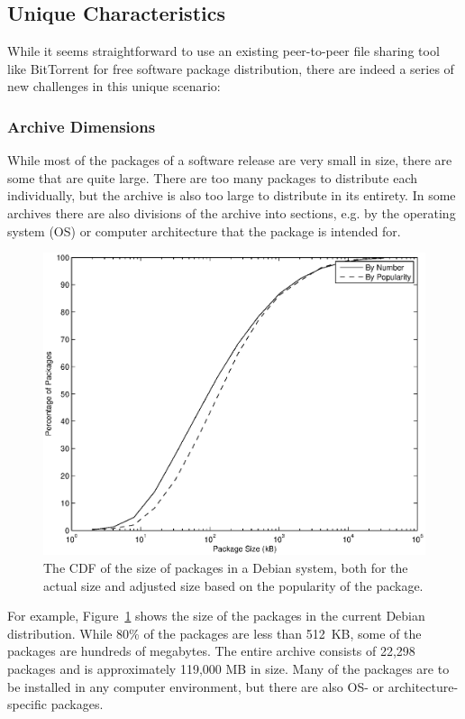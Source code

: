 \documentclass[conference]{IEEEtran}
\begin{document}
\subsection{Unique Characteristics}
\label{problems}

While it seems straightforward to use an existing peer-to-peer file sharing tool like BitTorrent for
free software package distribution, there are indeed a series of new challenges in this unique scenario:

\subsubsection{Archive Dimensions}

While most of the packages of a software release are very small in
size, there are some that are quite large. There are too many
packages to distribute each individually, but the archive is also
too large to distribute in its entirety. In some archives there are
also divisions of the archive into sections, e.g. by the operating system (OS) or computer
architecture that the package is intended for.

\begin{figure}
\centering
\includegraphics[width=0.80\columnwidth]{apt_p2p_simulation-size_CDF.eps}
\caption{The CDF of the size of packages in a Debian system, both
for the actual size and adjusted size based on the popularity of
the package.}
\label{size_CDF}
\end{figure}

For example, Figure~\ref{size_CDF} shows the size of the packages in the
current Debian distribution. While 80\% of the packages are less than
512~KB, some of the packages are hundreds of megabytes. The entire
archive consists of 22,298 packages and is approximately 119,000 MB
in size. Many of the packages are to be installed in any computer environment, but there are
also OS- or architecture-specific packages.
\end{document}
